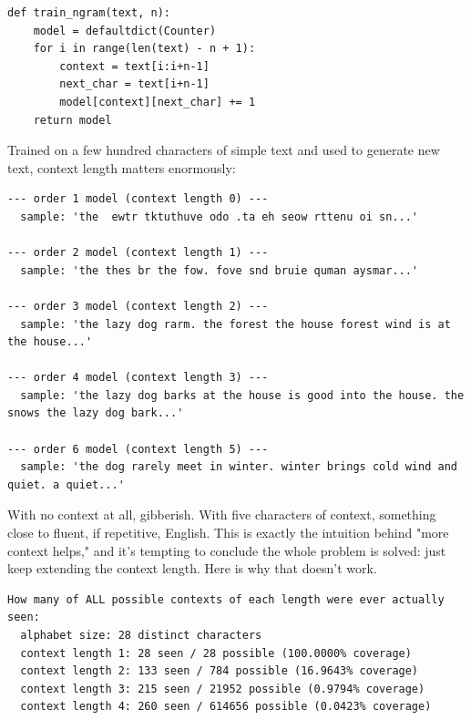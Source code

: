 \begin{Verbatim}[fontsize=\small, frame=single, xleftmargin=1em, xrightmargin=1em]
def train_ngram(text, n):
    model = defaultdict(Counter)
    for i in range(len(text) - n + 1):
        context = text[i:i+n-1]
        next_char = text[i+n-1]
        model[context][next_char] += 1
    return model
\end{Verbatim}

Trained on a few hundred characters of simple text and used to generate new text, context length matters enormously:

\begin{Verbatim}[fontsize=\small, frame=single, xleftmargin=1em, xrightmargin=1em]
--- order 1 model (context length 0) ---
  sample: 'the  ewtr tktuthuve odo .ta eh seow rttenu oi sn...'

--- order 2 model (context length 1) ---
  sample: 'the thes br the fow. fove snd bruie quman aysmar...'

--- order 3 model (context length 2) ---
  sample: 'the lazy dog rarm. the forest the house forest wind is at the house...'

--- order 4 model (context length 3) ---
  sample: 'the lazy dog barks at the house is good into the house. the snows the lazy dog bark...'

--- order 6 model (context length 5) ---
  sample: 'the dog rarely meet in winter. winter brings cold wind and quiet. a quiet...'
\end{Verbatim}

With no context at all, gibberish. With five characters of context, something close to fluent, if repetitive, English. This is exactly the intuition behind "more context helps," and it's tempting to conclude the whole problem is solved: just keep extending the context length. Here is why that doesn't work.

\begin{Verbatim}[fontsize=\small, frame=single, xleftmargin=1em, xrightmargin=1em]
How many of ALL possible contexts of each length were ever actually seen:
  alphabet size: 28 distinct characters
  context length 1: 28 seen / 28 possible (100.0000% coverage)
  context length 2: 133 seen / 784 possible (16.9643% coverage)
  context length 3: 215 seen / 21952 possible (0.9794% coverage)
  context length 4: 260 seen / 614656 possible (0.0423% coverage)
\end{Verbatim}


